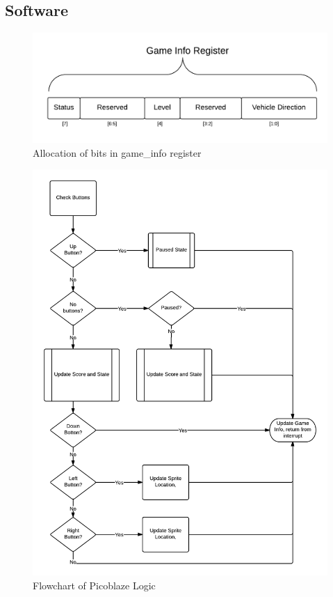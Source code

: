 \documentclass[11pt]{article}
\begin{document}
		
\subsection{Software}

					
		\begin{figure}[h]\centering
		  \includegraphics[width=.7\textwidth]{Images/game_info_bits.png}
		  \caption{Allocation of bits in game\_info register}
		  \label{game_info_bits}
		\end{figure}	

		\begin{figure}[h!]\centering
		  \includegraphics[width=.8\textwidth]{Images/game_logic.png}
		  \caption{Flowchart of Picoblaze Logic}
		  \label{game_logic}
		\end{figure}	
\end{document}
